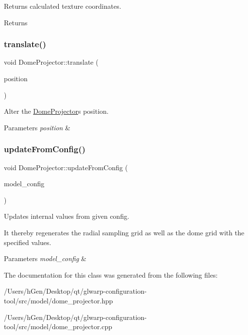 Returns calculated texture coordinates. 

\begin{DoxyReturn}{Returns}

\end{DoxyReturn}
\mbox{\label{class_dome_projector_afd963b30b1cd4fa401de40ce99a5da7b}} 
\subsubsection{\texorpdfstring{translate()}{translate()}}
{\footnotesize\ttfamily void Dome\+Projector\+::translate (\begin{DoxyParamCaption}\item[{Q\+Vector3D}]{position }\end{DoxyParamCaption})}



Alter the \mbox{\hyperlink{class_dome_projector}{Dome\+Projector}}\textquotesingle{}s position. 


\begin{DoxyParams}{Parameters}
{\em position} & \\
\hline
\end{DoxyParams}
\mbox{\label{class_dome_projector_a70b4a39dec84fa11faf57a7dbd422c37}} 
\subsubsection{\texorpdfstring{update\+From\+Config()}{updateFromConfig()}}
{\footnotesize\ttfamily void Dome\+Projector\+::update\+From\+Config (\begin{DoxyParamCaption}\item[{\mbox{\hyperlink{struct_model_config}{Model\+Config}} $\ast$}]{model\+\_\+config }\end{DoxyParamCaption})}



Updates internal values from given config. 

It thereby regenerates the radial sampling grid as well as the dome grid with the specified values. 
\begin{DoxyParams}{Parameters}
{\em model\+\_\+config} & \\
\hline
\end{DoxyParams}


The documentation for this class was generated from the following files\+:\begin{DoxyCompactItemize}
\item 
/\+Users/h\+Gen/\+Desktop/qt/glwarp-\/configuration-\/tool/src/model/dome\+\_\+projector.\+hpp\item 
/\+Users/h\+Gen/\+Desktop/qt/glwarp-\/configuration-\/tool/src/model/dome\+\_\+projector.\+cpp\end{DoxyCompactItemize}
